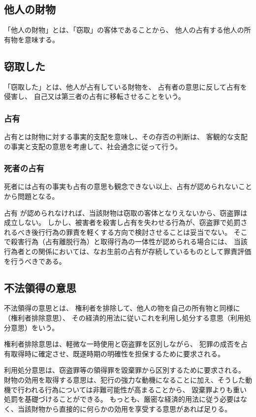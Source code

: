 \documentclass[11pt]{jsarticle}
\begin{document}
		\subsection{他人の財物}
			「他人の財物」とは、「窃取」の客体であることから、
			他人の占有する他人の所有物を意味する。
			
		\subsection{窃取した}
			「窃取した」とは、他人が占有している財物を、
			占有者の意思に反して占有を侵害し、
			自己又は第三者の占有に移転させることをいう。
			
			\subsubsection{占有}
				占有とは財物に対する事実的支配を意味し、その存否の判断は、
				客観的な支配の事実と支配の意思を考慮して、社会通念に従って行う。
			
			\subsubsection{死者の占有}
				死者には占有の事実も占有の意思も観念できない以上、占有が認められないことから問題となる。
			
				占有	が認められなければ、当該財物は窃取の客体となりえないから、窃盗罪は成立しない。
				しかし、被害者を殺害し占有を失わせる行為が、窃盗罪で処罰されるべき後行行為の罪責を軽くする方向で検討させることは妥当でない。
				そこで殺害行為（占有離脱行為）と取得行為の一体性が認められる場合には、
				当該行為者との関係においては、なお生前の占有が存続しているものとして罪責評価を行うべきである。
		\subsection{不法領得の意思}
			不法領得の意思とは、
			権利者を排除して、他人の物を自己の所有物と同様に（権利者排除意思）、
			その経済的用法に従いこれを利用し処分する意思（利用処分意思）をいう。
			
			権利者排除意思は、軽微な一時使用と窃盗罪を区別しながら、
			犯罪の成否を占有取得時に確定させ、既遂時期の明確性を担保するために要求される。
			
			利用処分意思は、窃盗罪等の領得罪を毀棄罪から区別するために要求される。
			財物の効用を取得する意思は、犯行の強力な動機になることに加え、そうした動機で行われる行為については非難可能性が高まることから、
			毀棄罪よりも重い処罰を基礎づけることができる。
			もっとも、厳密な経済的用法に従う必要はなく、当該財物から直接的に何らかの効用を享受する意思があれば足りる。
		
\end{document}
